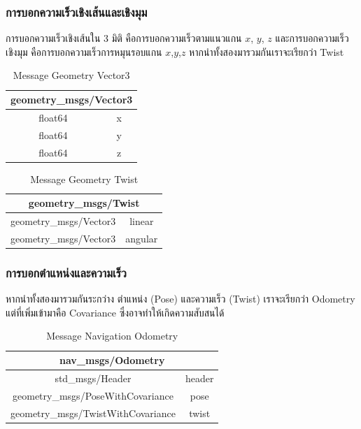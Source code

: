 \subsubsection*{การบอกความเร็วเชิงเส้นและเชิงมุม}
การบอกความเร็วเชิงเส้นใน 3 มิติ คือการบอกความเร็วตามแนวแกน $x$, $y$, $z$ และการบอกความเร็วเชิงมุม
คือการบอกความเร็วการหมุนรอบแกน $x$,$y$,$z$ หากนำทั้งสองมารวมกันเราจะเรียกว่า Twist
\begin{table}[!ht]
	\centering
	\begin{tabular}{| c | c |}
		\hline
		\multicolumn{2}{|c|}{geometry\_msgs/Vector3}\\
		\hline
		float64 & x \\
		float64 & y \\
		float64 & z \\
		\hline
	\end{tabular}
	\caption{Message Geometry Vector3}
	\label{tab:geometry_vector3}
\end{table}
\begin{table}[!ht]
	\centering
	\begin{tabular}{| c | c |}
		\hline
		\multicolumn{2}{|c|}{geometry\_msgs/Twist}\\
		\hline
		geometry\_msgs/Vector3 & linear \\
		geometry\_msgs/Vector3 & angular \\
		\hline
	\end{tabular}
	\caption{Message Geometry Twist}
	\label{tab:geometry_twist}
\end{table}

\subsubsection*{การบอกตำแหน่งและความเร็ว}
หากนำทั้งสองมารวมกันระกว่าง ตำแหน่ง (Pose) และความเร็ว (Twist) เราจะเรียกว่า Odometry
แต่ที่เพิ่มเข้ามาคือ Covariance ซึ่งอาจทำให้เกิดความสับสนได้
\begin{table}[!ht]
	\centering
	\begin{tabular}{| c | c |}
		\hline
		\multicolumn{2}{|c|}{nav\_msgs/Odometry}\\
		\hline
		std\_msgs/Header & header \\
		geometry\_msgs/PoseWithCovariance & pose \\
		geometry\_msgs/TwistWithCovariance & twist \\
		\hline
	\end{tabular}
	\caption{Message Navigation Odometry}
	\label{tab:nav_odometry}
\end{table}

